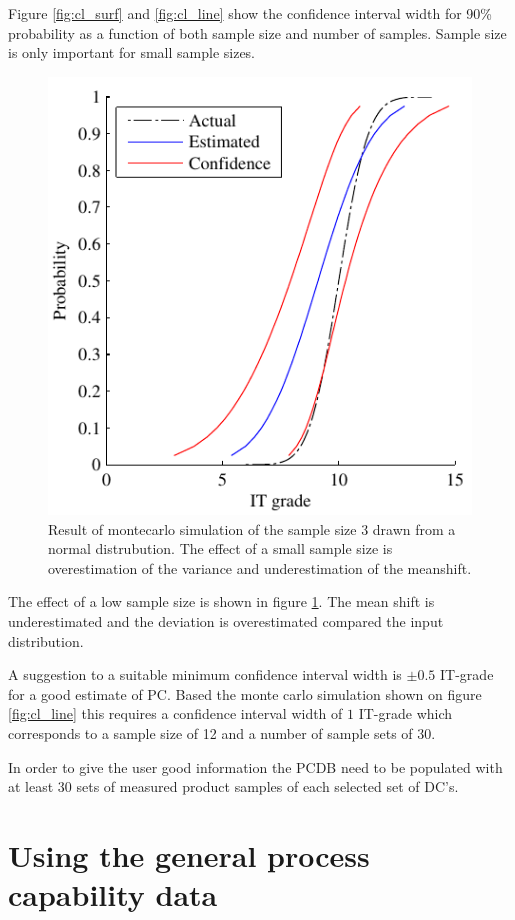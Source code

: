 \documentclass[aip,amsmath, reprint, author-year]{revtex4-1}
\begin{document}
Figure \ref{fig:cl_surf} and \ref{fig:cl_line} show the confidence interval width for 90\% probability as a function of both sample size and number of samples. Sample size is only important for small sample sizes. 

\begin{figure}
\includegraphics{effectoflowsamplesize.pdf}
\caption{\label{fig:effect} Result of montecarlo simulation of the sample size 3 drawn from a normal distrubution. The effect of a small sample size is overestimation of the variance and underestimation of the meanshift. }
\end{figure}

The effect of a low sample size is shown in figure \ref{fig:effect}. The mean shift is underestimated and the deviation is overestimated compared the input distribution.

A suggestion to a suitable minimum confidence interval width is $\pm 0.5$ IT-grade for a good estimate of PC.  Based the monte carlo simulation shown on figure \ref{fig:cl_line} this requires a confidence interval width of $1$ IT-grade which corresponds to a sample size of 12 and a number of sample sets of 30. 

In order to give the user good information the PCDB need to be populated with at least 30 sets of measured product samples of each selected set of DC's.

\section{Using the general process capability data}
\end{document}
